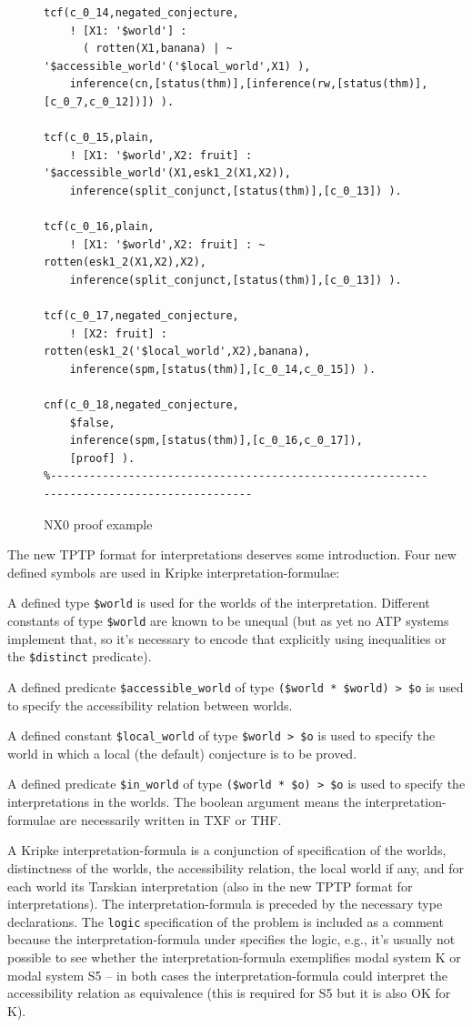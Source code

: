 \documentclass{ceurart}
\newenvironment{packed_itemize}{
\vspace*{-0.5em}
\begin{itemize}
\setlength{\partopsep}{0pt}
\setlength{\itemsep}{1pt}
\setlength{\parskip}{0pt}
\setlength{\parsep}{0pt}
}{\end{itemize}}
\begin{document}
\begin{figure}[h!]
{{\begin{verbatim}
tcf(c_0_14,negated_conjecture,
    ! [X1: '$world'] :
      ( rotten(X1,banana) | ~ '$accessible_world'('$local_world',X1) ),
    inference(cn,[status(thm)],[inference(rw,[status(thm)],[c_0_7,c_0_12])]) ).

tcf(c_0_15,plain,
    ! [X1: '$world',X2: fruit] : '$accessible_world'(X1,esk1_2(X1,X2)),
    inference(split_conjunct,[status(thm)],[c_0_13]) ).

tcf(c_0_16,plain,
    ! [X1: '$world',X2: fruit] : ~ rotten(esk1_2(X1,X2),X2),
    inference(split_conjunct,[status(thm)],[c_0_13]) ).

tcf(c_0_17,negated_conjecture,
    ! [X2: fruit] : rotten(esk1_2('$local_world',X2),banana),
    inference(spm,[status(thm)],[c_0_14,c_0_15]) ).

cnf(c_0_18,negated_conjecture,
    $false,
    inference(spm,[status(thm)],[c_0_16,c_0_17]),
    [proof] ).
%------------------------------------------------------------------------------------------
\end{verbatim}
}}
\caption{NX0 proof example}
\label{NX0Proof}
\end{figure}

The new TPTP format for interpretations deserves some introduction.
Four new defined symbols are used in Kripke interpretation-formulae:
\begin{packed_itemize}
\item A defined type {\tt \$world} is used for the worlds of the interpretation.
      Different constants of type {\tt \$world} are known to be unequal (but as yet no ATP 
      systems implement that, so it's necessary to encode that explicitly using inequalities or 
      the {\tt \$distinct} predicate).
\item A defined predicate {\tt \$accessible\_world} of type {\tt (\$world~*~\$world)~>~\$o}
      is used to specify the accessibility relation between worlds.
\item A defined constant {\tt \$local\_world} of type {\tt \$world~>~\$o} is used to specify 
      the world in which a local (the default) conjecture is to be proved. 
\item A defined predicate {\tt \$in\_world} of type {\tt (\$world~*~\$o)~>~\$o} is used to 
      specify the interpretations in the worlds.
      The boolean argument means the interpretation-formulae are necessarily written in TXF or THF.
\end{packed_itemize}
A Kripke interpretation-formula is a conjunction of specification of the worlds,
distinctness of the worlds,
the accessibility relation,
the local world if any,
and
for each world its Tarskian interpretation (also in the new TPTP format for interpretations).
The interpretation-formula is preceded by the necessary type declarations.
The {\tt logic} specification of the problem is included as a comment because the
interpretation-formula under specifies the logic, e.g., it's usually not possible to see whether
the interpretation-formula exemplifies modal system K or modal system S5 -- in both cases the
interpretation-formula could interpret the accessibility relation as equivalence (this is 
required for S5 but it is also OK for K).
\end{document}

